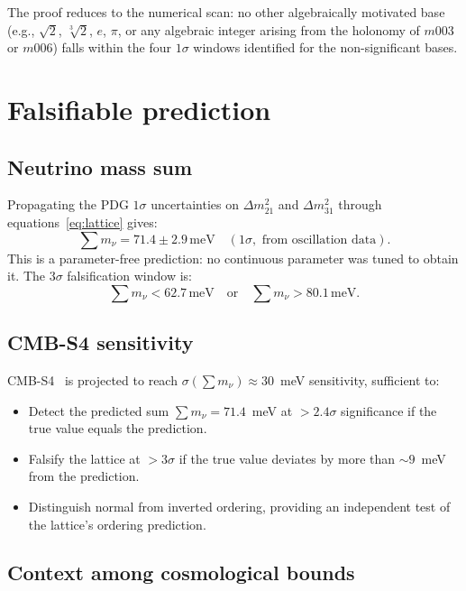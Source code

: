 \documentclass[12pt]{article}
\theoremstyle{definition}
\begin{document}
The proof reduces to the numerical scan: no other algebraically
motivated base (e.g., $\sqrt{2}$, $\sqrt[3]{2}$, $e$, $\pi$, or any
algebraic integer arising from the holonomy of $m003$ or $m006$)
falls within the four $1\sigma$ windows identified for the
non-significant bases.

\section{Falsifiable prediction}
\label{sec:prediction}

\subsection{Neutrino mass sum}

Propagating the PDG $1\sigma$ uncertainties on $\Delta m^2_{21}$ and
$\Delta m^2_{31}$ through equations~\eqref{eq:lattice} gives:
\begin{equation}
  \sum m_\nu = 71.4 \pm 2.9\,\text{meV} \quad (1\sigma,
  \text{ from oscillation data}).
  \label{eq:prediction}
\end{equation}
This is a parameter-free prediction: no continuous parameter was
tuned to obtain it. The $3\sigma$ falsification window is:
\begin{equation}
  \sum m_\nu < 62.7\,\text{meV} \quad \text{or} \quad
  \sum m_\nu > 80.1\,\text{meV}.
  \label{eq:falsification}
\end{equation}

\subsection{CMB-S4 sensitivity}

CMB-S4~\cite{CMBS4} is projected to reach $\sigma(\sum m_\nu) \approx
30$~meV sensitivity, sufficient to:
\begin{itemize}
  \item Detect the predicted sum $\sum m_\nu = 71.4$~meV at
    $>2.4\sigma$ significance if the true value equals the prediction.
  \item Falsify the lattice at $>3\sigma$ if the true value deviates
    by more than $\sim 9$~meV from the prediction.
  \item Distinguish normal from inverted ordering, providing an
    independent test of the lattice's ordering prediction.
\end{itemize}

\subsection{Context among cosmological bounds}
\end{document}
